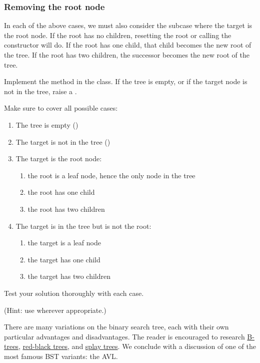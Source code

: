 \subsubsection*{Removing the root node}

In each of the above cases, we must also consider the subcase where the target is the root node.
If the root has no children, resetting the root or calling the constructor will do.
If the root has one child, that child becomes the new root of the tree.
If the root has two children, the successor becomes the new root of the tree.

\begin{problem}
Implement the  method in the  class.
If the tree is empty, or if the target node is not in the tree, raise a .

Make sure to cover all possible cases:
\begin{enumerate}
\item The tree is empty ()
\item The target is not in the tree ()
\item The target is the root node:
	\begin{enumerate}
	\item{the root is a leaf node, hence the only node in the tree}
	\item{the root has one child}
	\item{the root has two children}
	\end{enumerate}
\item The target is in the tree but is not the root:
	\begin{enumerate}
	\item{the target is a leaf node}
	\item{the target has one child}
	\item{the target has two children}
	\end{enumerate}
\end{enumerate}
Test your solution thoroughly with each case.

(Hint: use  wherever appropriate.)
\end{problem}

There are many variations on the binary search tree, each with their own particular advantages and disadvantages.
The reader is encouraged to research \href{https://en.wikipedia.org/wiki/B-tree}{B-trees}, \href{https://en.wikipedia.org/wiki/Red%E2%80%93black_tree}{red-black trees}, and \href{https://en.wikipedia.org/wiki/Splay_tree}{splay trees}.
We conclude with a discussion of one of the most famous BST variants: the AVL.

